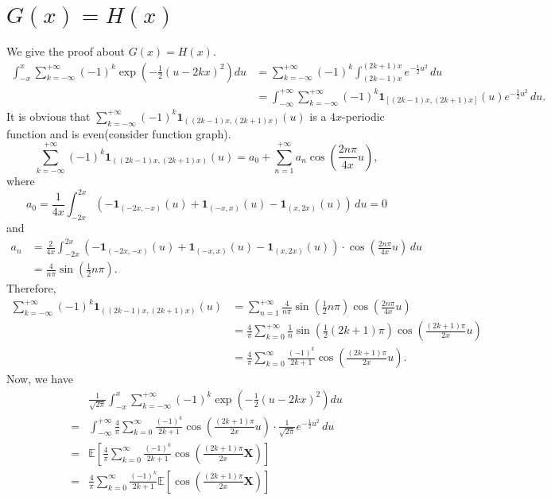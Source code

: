 \documentclass[11pt]{article}
\theoremstyle{definition}
\begin{document}
\section{$G(x)=H(x)$}
We give the proof about $G(x)=H(x)$.
\begin{equation*}
  \begin{aligned}
   \int^x_{-x} \sum^{+\infty}_{k=-\infty} (-1)^k\exp\left( -\frac{1}{2}(u-2kx)^2\right)du   &= \sum^{+\infty}_{k=-\infty} (-1)^k \int^{(2k+1)x}_{(2k-1)x} e^{-\frac{1}{2} u^2}\,du\\ 
&=\int^{+\infty}_{-\infty} \sum_{k=-\infty}^{+\infty}(-1)^k \mathbf{1}_{[(2k-1)x, (2k+1)x]}(u) e^{-\frac{1}{2}u^2}\,du.
  \end{aligned}
\end{equation*}
It is obvious that $\sum_{k=-\infty}^{+\infty}(-1)^k \mathbf{1}_{((2k-1)x, (2k+1)x)}(u)$ is a $4x$-periodic function and is even(consider function graph).
\[
\sum_{k=-\infty}^{+\infty}(-1)^k \mathbf{1}_{((2k-1)x, (2k+1)x)}(u)=a_0+\sum_{n=1}^{+\infty} a_n \cos\left( \frac{2n\pi}{4x}u \right),
\]
where $$a_0=\frac{1}{4x} \int_{-2x}^{2x}  \left(-\mathbf{1}_{(-2x, -x)}(u) +\mathbf{1}_{(-x, x)}(u) -\mathbf{1}_{(x, 2x)}(u)  \right)\,du=0$$
and 
\begin{equation*}
  \begin{aligned}
     a_n& =\frac{2}{4x}\int^{2x}_{-2x}\left(-\mathbf{1}_{(-2x, -x)}(u) +\mathbf{1}_{(-x, x)}(u) -\mathbf{1}_{(x, 2x)}(u)    \right)\cdot \cos\left(\frac{2n\pi}{4x} u\right)\,du\\
&=\frac{4}{n\pi}  \sin\left(\frac{1}{2}n\pi\right). 
  \end{aligned}
\end{equation*}
Therefore, 
\begin{equation*}
  \begin{aligned}
   \sum_{k=-\infty}^{+\infty}(-1)^k \mathbf{1}_{((2k-1)x, (2k+1)x)}(u)&=\sum_{n=1}^{+\infty} \frac{4}{n\pi}  \sin\left(\frac{1}{2}n\pi\right)\cos\left( \frac{2n\pi}{4x}u \right)\\ 
&=\frac{4}{\pi}\sum^{+\infty}_{k=0} \frac{1}{n}\sin\left( \frac{1}{2}(2k+1)\pi \right)\cos\left( \frac{(2k+1)\pi}{2x} u\right)\\ 
&=\frac{4}{\pi} \sum^{\infty}_{k=0} \frac{(-1)^k}{2k+1}\cos\left( \frac{(2k+1)\pi}{2x} u\right).
  \end{aligned}
\end{equation*}
Now, we have
\begin{equation*}
  \begin{aligned}
     & \frac{1}{\sqrt{2\pi}}\int^x_{-x} \sum^{+\infty}_{k=-\infty} (-1)^k\exp\left( -\frac{1}{2}(u-2kx)^2\right)du  \\ 
=&\int^{+\infty}_{-\infty} \frac{4}{\pi} \sum^{\infty}_{k=0} \frac{(-1)^k}{2k+1}\cos\left( \frac{(2k+1)\pi}{2x} u\right) \cdot\frac{1}{\sqrt{2\pi}}e^{-\frac{1}{2} u^2}\,du\\ 
=&\mathbb{E}\left[ \frac{4}{\pi} \sum^{\infty}_{k=0} \frac{(-1)^k}{2k+1}\cos\left( \frac{(2k+1)\pi}{2x} \mathbf{X}\right)\right]\\
=&\frac{4}{\pi} \sum^{\infty}_{k=0} \frac{(-1)^k}{2k+1}\mathbb{E}\left[ \cos\left( \frac{(2k+1)\pi}{2x} \mathbf{X}\right)\right]
  \end{aligned}
\end{equation*}
\end{document}
